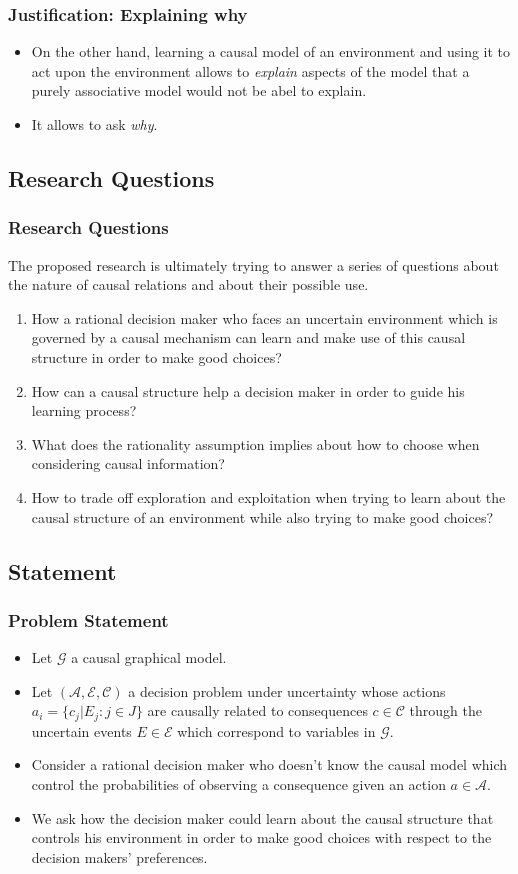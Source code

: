 \documentclass{beamer}
\theoremstyle{plain}
\begin{document}
	\begin{frame}
	\frametitle{Justification: Explaining why}
	\begin{itemize}
	\item On the other hand, learning a causal model of an environment and using it to act upon the environment allows to \textit{explain} aspects of the model that a purely associative model would not be abel to explain. 
	\item It allows to ask \textit{why}.
	\end{itemize}
	\end{frame}

	\subsection{Research Questions}
	\begin{frame}
	\frametitle{Research Questions}
	The proposed research is ultimately trying to answer a series of questions about the nature of causal relations and about their possible use.
	\begin{enumerate}
	\item How a rational decision maker who faces an uncertain environment which is governed by a causal mechanism can learn and make use of this causal structure in order to make good    	choices? 
	\item How can a causal structure help a decision maker in order to guide his learning process? 
	\item What does the rationality assumption implies about how to choose when considering causal information? 
\item How to trade off exploration and exploitation when trying to learn about the causal structure of an environment while also trying to make good choices?
\end{enumerate}
\end{frame}

\subsection{Statement}
	\begin{frame}
	\frametitle{Problem Statement}
	\begin{itemize}
	\item Let  $\mathcal{G}$ a causal graphical model.
	\item Let $(\mathcal{A},\mathcal{E},\mathcal{C})$ a decision problem under uncertainty whose actions $a_i = \{ c_j | E_j : j \in J \}$  are causally related to consequences $c \in \mathcal{C}$ through the uncertain events $E \in \mathcal{E}$ which correspond to variables in $\mathcal{G}$. 
	\item Consider a rational decision maker who doesn't know the causal model which control the probabilities of observing a consequence given an action $a \in \mathcal{A}$.
	\item We ask how the decision maker could learn about the causal structure that controls his environment in order to make good choices with respect to the decision makers' preferences.
	\end{itemize}
	\end{frame}
\end{document}

